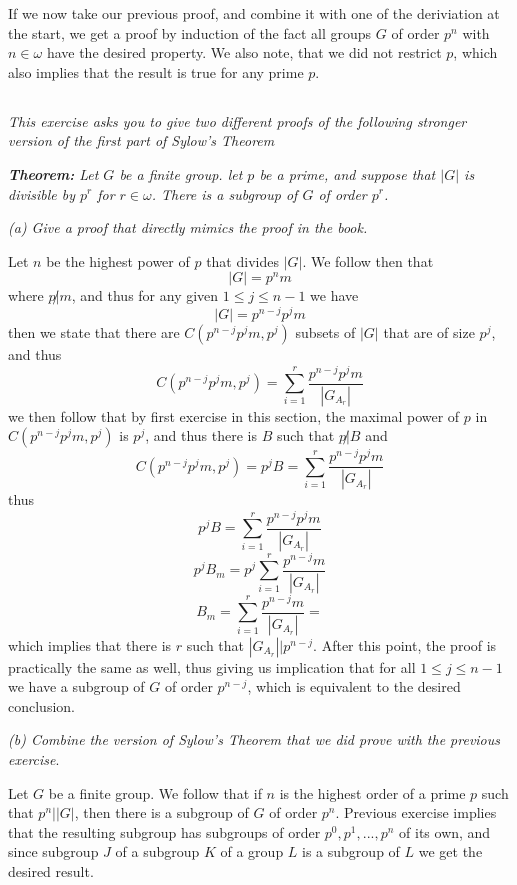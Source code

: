 \documentclass[11pt,oneside,titlepage]{book}
\begin{document}
If we now take our previous proof, and combine it with one of the
deriviation at the start, we get a proof by induction of the fact all
groups $G$ of order $p^n$ with $n \in \omega$ have the desired
property. We also note, that we did not restrict $p$, which also
implies that the result is true for any prime $p$.

\subsection{}

\textit{This exercise asks you to give two different proofs of the following
  stronger version of the first part of Sylow's Theorem}

\textit{\textbf{Theorem: } Let $G$ be a finite group. let $p$ be a
  prime, and suppose that $|G|$ is divisible by $p^r$ for $r \in
  \omega$.  There is a subgroup of $G$ of order $p^r$.}

\textit{(a) Give a proof that directly mimics the proof in the book.}

Let $n$ be the highest power of $p$ that divides $|G|$. We follow then
that
$$|G| = p^nm$$
where $p \not | m$, and thus for any given $1 \leq j \leq n - 1$ we have
$$|G| = p^{n - j}p^j{m}$$
then we state that there are $C(p^{n - j}p^j{m}, p^j)$ subsets of
$|G|$ that are of size $p^j$, and thus
$$C(p^{n - j}p^jm, p^j) = \sum_{i = 1}^{r}{\frac{p^{n - j}p^jm}{|G_{A_r}|}}$$
we then follow that by first exercise in this section, the maximal power
of $p$ in $C(p^{n - j}p^jm, p^j)$ is $p^j$, and thus there is $B$ such that
$p \not | B$ and 
$$C(p^{n - j}p^jm, p^j) = p^j B = \sum_{i = 1}^{r}{\frac{p^{n - j}p^jm}{|G_{A_r}|}}$$
thus
$$p^j B = \sum_{i = 1}^{r}{\frac{p^{n - j}p^jm}{|G_{A_r}|}}$$
$$p^j B_m = p^j \sum_{i = 1}^{r}{\frac{p^{n - j}m}{|G_{A_r}|}}$$
$$B_m = \sum_{i = 1}^{r}{\frac{p^{n - j}m}{|G_{A_r}|}} = $$
which implies that there is $r$ such that $|G_{A_r}| | p^{n - j}$.
After this point, the proof is practically the same as well, thus giving
us implication that for all $1 \leq j \leq n - 1$ we have a subgroup of $G$
of order $p^{n - j}$, which is equivalent to the desired conclusion.

\textit{(b) Combine the version of Sylow's Theorem that we did prove
  with the previous exercise}.

Let $G$ be a finite group. We follow that if $n$ is the highest order
of a prime $p$ such that $p^n | |G|$, then there is a subgroup of $G$
of order $p^n$. Previous exercise implies that the resulting subgroup
has subgroups of order $p^0, p^1, ..., p^n$ of its own, and since
subgroup $J$ of a subgroup $K$ of a group $L$ is a subgroup of $L$ we
get the desired result.
\end{document}
